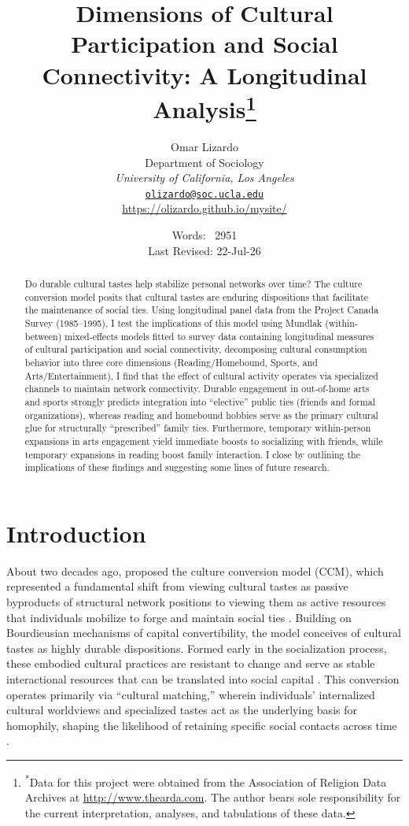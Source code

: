 \documentclass[
]{article}
\title{Dimensions of Cultural Participation and Social Connectivity: A Longitudinal Analysis\footnote{\textsuperscript{*}Data for this project were obtained from the Association of Religion Data Archives at \url{http://www.thearda.com}. The author bears sole responsibility for the current interpretation, analyses, and tabulations of these data.}}
\author{Omar Lizardo \\ Department of Sociology \\ \textit{University of California, Los Angeles} \\ \href{mailto:olizardo@soc.ucla.edu}{\nolinkurl{olizardo@soc.ucla.edu}} \\ \url{https://olizardo.github.io/mysite/}}
\date{Words: ~2951 \\ Last Revised: 22-Jul-26}
\begin{document}
\maketitle

\newpage
\begin{abstract}
Do durable cultural tastes help stabilize personal networks over time? The culture conversion model posits that cultural tastes are enduring dispositions that facilitate the maintenance of social ties. Using longitudinal panel data from the Project Canada Survey (1985--1995), I test the implications of this model using Mundlak (within-between) mixed-effects models fitted to survey data containing longitudinal measures of cultural participation and social connectivity, decomposing cultural consumption behavior into three core dimensions (Reading/Homebound, Sports, and Arts/Entertainment), I find that the effect of cultural activity operates via specialized channels to maintain network connectivity. Durable engagement in out-of-home arts and sports strongly predicts integration into ``elective'' public ties (friends and formal organizations), whereas reading and homebound hobbies serve as the primary cultural glue for structurally ``prescribed'' family ties. Furthermore, temporary within-person expansions in arts engagement yield immediate boosts to socializing with friends, while temporary expansions in reading boost family interaction. I close by outlining the implications of these findings and suggesting some lines of future research. 
\end{abstract}

\newpage
\section{Introduction}\label{introduction}
About two decades ago, \citet{lizardo2006} proposed the culture conversion model (CCM), which represented a fundamental shift from viewing cultural tastes as passive byproducts of structural network positions to viewing them as active resources that individuals mobilize to forge and maintain social ties \citep{puetz2015, lizardo2024}. Building on Bourdieusian mechanisms of capital convertibility, the model conceives of cultural tastes as highly durable dispositions. Formed early in the socialization process, these embodied cultural practices are resistant to change and serve as stable interactional resources that can be translated into social capital \citep{cebula2022, lewis2018conversion-9be}. This conversion operates primarily via ``cultural matching,'' wherein individuals' internalized cultural worldviews and specialized tastes act as the underlying basis for homophily, shaping the likelihood of retaining specific social contacts across time \citep{vaisey2010, lizardo2025}.
\end{document}
